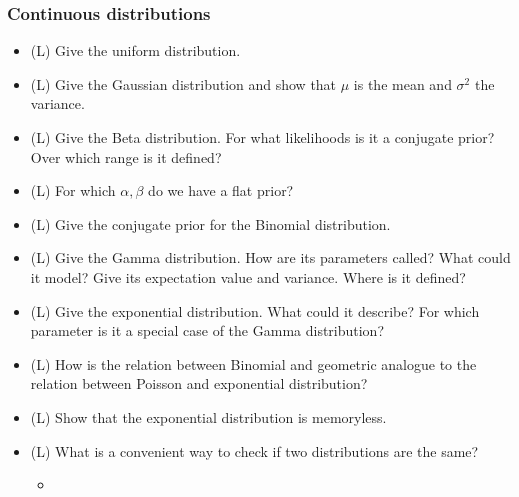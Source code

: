 \subsubsection*{Continuous distributions}
\begin{itemize}
    \item (L) Give the uniform distribution.
    \answerboxS
    \item (L) Give the Gaussian distribution and show that $\mu$ is the mean and $\sigma^2$ the variance.
    \answerboxL
    \item (L) Give the Beta distribution. For what likelihoods is it a conjugate prior? Over which range is it defined?
    \answerboxL
    \item (L) For which $\alpha, \beta$ do we have a flat prior?
    \answerboxS
    \item (L) Give the conjugate prior for the Binomial distribution.
    \answerboxM
    \item (L) Give the Gamma distribution. How are its parameters called? What could it model? Give its expectation value and variance. Where is it defined?
    \answerboxM
    \item (L) Give the exponential distribution. What could it describe? For which parameter is it a special case of the Gamma distribution?
    \answerboxM
    \item (L) How is the relation between Binomial and geometric analogue to the relation between Poisson and exponential distribution?
    \answerboxS
    \item (L) Show that the exponential distribution is memoryless.
    \answerboxM
    \item (L) What is a convenient way to check if two distributions are the same?
    \begin{itemize}
        \item {}
    \end{itemize}
    \answerboxS
\end{itemize}

